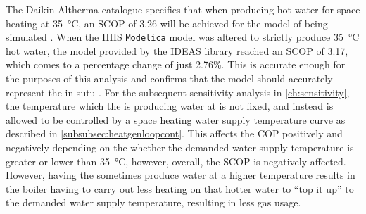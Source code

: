 The Daikin Altherma \HP catalogue specifies that when producing hot water for space heating at \qty{35}{\celsius}, an \ac{SCOP} of 3.26 will be achieved for the model of \HP being simulated \cite{daikin_daikin_2018}. When the \ac{HHS} \texttt{Modelica} model was altered to strictly produce \qty{35}{\celsius} hot water, the \HP model provided by the IDEAS library reached an \ac{SCOP} of 3.17, which comes to a percentage change of just 2.76\%. This is accurate enough for the purposes of this analysis and confirms that the model should accurately represent the in-sutu \HP. For the subsequent sensitivity analysis in \cref{ch:sensitivity}, the temperature which the \HP is producing water at is not fixed, and instead is allowed to be controlled by a space heating water supply temperature curve as described in \cref{subsubsec:heatgenloopcont}. This affects the \ac{COP} positively and negatively depending on the whether the demanded water supply temperature is greater or lower than \qty{35}{\celsius}, however, overall, the \ac{SCOP} is negatively affected. However, having the \HP sometimes produce water at a higher temperature results in the boiler having to carry out less heating on that hotter water to ``top it up'' to the demanded water supply temperature, resulting in less gas usage.





